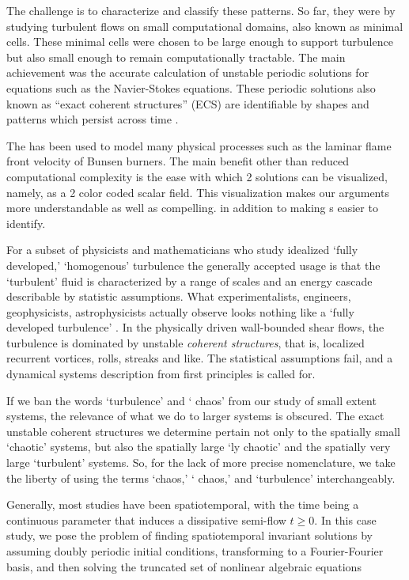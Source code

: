 The challenge is to characterize and classify these patterns.
So far, they were
by studying turbulent flows on small computational domains, also known as minimal cells.
These minimal cells
were chosen to be large
enough to support turbulence but also small enough to
remain computationally tractable.
The main achievement
was the accurate calculation of unstable periodic solutions for
equations such as the Navier-Stokes equations. %
These periodic solutions also known as ``exact coherent structures'' (ECS) are
identifiable by shapes and patterns
which persist across time .

The {\KSe} has been used to model many physical processes such as
the laminar flame front velocity of Bunsen burners.
The main benefit other than reduced computational complexity
is the ease with which 2{\dmn} {\spt}
solutions can be visualized, namely, as a 2{\dmn} color coded scalar
field. This visualization makes our arguments more understandable as well as compelling.
in addition to making {\fpo}s easier to identify.

For a subset of physicists and mathematicians who study idealized `fully
developed,' `homogenous' turbulence the generally accepted usage is that
the `turbulent' fluid is characterized by a range of scales and an energy
cascade describable by statistic assumptions. What
experimentalists, engineers, geophysicists, astrophysicists actually
observe looks nothing like a `fully developed turbulence' .
In the physically driven wall-bounded shear flows, the turbulence is dominated
by unstable \emph{coherent structures}, that is, localized recurrent
vortices, rolls, streaks and like. The statistical assumptions fail, and
a dynamical systems description from first principles is called
for.

If we ban the words `turbulence' and `{\spt} chaos' from our study of
small extent systems, the relevance of what we do to larger systems is
obscured. The exact unstable coherent structures we determine pertain not
only to the spatially small `chaotic' systems, but also the spatially
large `{\spt}ly chaotic' and the spatially very large `turbulent'
systems. So, for the lack of more precise nomenclature, we take the
liberty of using the terms `chaos,' `{\spt} chaos,' and `turbulence'
interchangeably.

Generally, most studies have
been spatiotemporal, with the time being a continuous parameter that
induces a dissipative semi-flow $t \geq 0$. In this case study, we pose
the problem of finding spatiotemporal invariant solutions by assuming
doubly periodic initial conditions, transforming to a Fourier-Fourier
basis, and then solving the truncated set of nonlinear algebraic
equations
